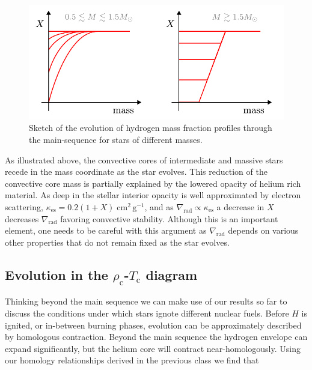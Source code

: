 \documentclass[twocolumn]{article}
\begin{document}
\begin{figure}
\centering
\includegraphics{../assets/10_stellar_evo/composition.pdf}
\caption{Sketch of the evolution of hydrogen mass fraction profiles
through the main-sequence for stars of different masses.}
\end{figure}

As illustrated above, the convective cores of intermediate and massive
stars recede in the mass coordinate as the star evolves. This reduction
of the convective core mass is partially explained by the lowered
opacity of helium rich material. As deep in the stellar interior opacity
is well approximated by electron scattering,
\(\kappa_\mathrm{es}=0.2(1+X)\;\mathrm{cm^2\,g^{-1}}\), and as
\(\nabla_\mathrm{rad}\propto \kappa_\mathrm{es}\) a decrease in \(X\)
decreases \(\nabla_\mathrm{rad}\) favoring convective stability.
Although this is an important element, one needs to be careful with this
argument as \(\nabla_\mathrm{rad}\) depends on various other properties
that do not remain fixed as the star evolves.

\hypertarget{evolution-in-the-rho_mathrmc-t_mathrmc-diagram}{%
\subsection{\texorpdfstring{Evolution in the
\(\rho_\mathrm{c}\)-\(T_\mathrm{c}\)
diagram}{Evolution in the \textbackslash rho\_\textbackslash mathrm\{c\}-T\_\textbackslash mathrm\{c\} diagram}}\label{evolution-in-the-rho_mathrmc-t_mathrmc-diagram}}

Thinking beyond the main sequence we can make use of our results so far
to discuss the conditions under which stars ignote different nuclear
fuels. Before \(H\) is ignited, or in-between burning phases, evolution
can be approximately described by homologous contraction. Beyond the
main sequence the hydrogen envelope can expand significantly, but the
helium core will contract near-homologously. Using our homology
relationships derived in the previous class we find that
\end{document}
